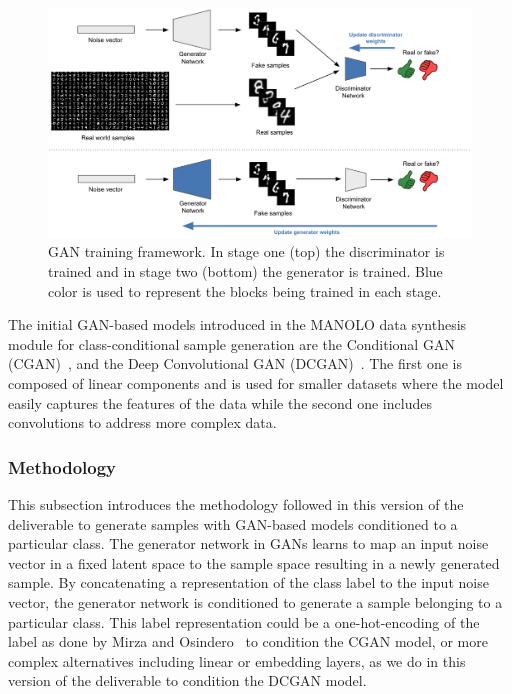\begin{figure}[h]
    \centering
    \caption[GAN training framework.]{\label{fig:gans_schematic} GAN training framework. In stage one (top) the discriminator is trained and in stage two (bottom) the generator is trained. Blue color is used to represent the blocks being trained in each stage.}
    \includegraphics[width=0.90\columnwidth]{fig_datasynth/gans_training_shematic.png} 
\end{figure}


The initial GAN-based models introduced in the MANOLO data synthesis module for class-conditional sample generation are the Conditional GAN (CGAN)~\citep{2014_arxiv_CGAN}, and the Deep Convolutional GAN (DCGAN)~\citep{2015_ICLR_DCGAN}. The first one is composed of linear components and is used for smaller datasets where the model easily captures the features of the data while the second one includes convolutions to address more complex data.
        
\subsubsection{Methodology}

This subsection introduces the methodology followed in this version of the deliverable to generate samples with GAN-based models conditioned to a particular class. The generator network in GANs learns to map an input noise vector in a fixed latent space to the sample space resulting in a newly generated sample. By concatenating a representation of the class label to the input noise vector, the generator network is conditioned to generate a sample belonging to a particular class. This label representation could be a one-hot-encoding of the label as done by Mirza and Osindero~\citep{2014_arxiv_CGAN} to condition the CGAN model, or more complex alternatives including linear or embedding layers, as we do in this version of the deliverable to condition the DCGAN model.


